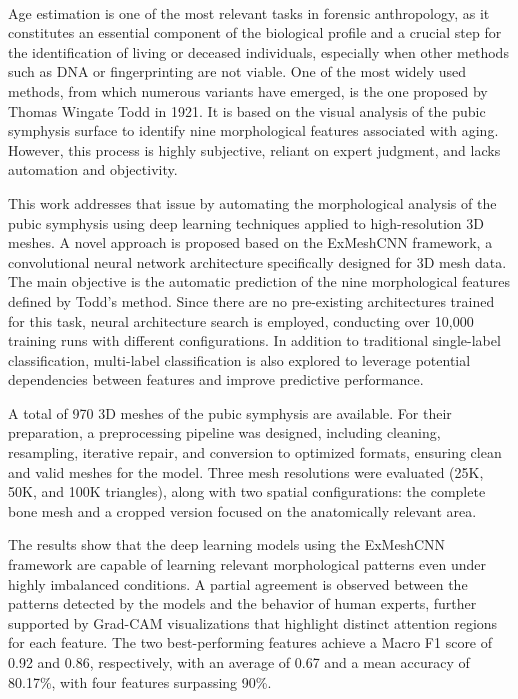 \vspace{0.7cm}
 \\

Age estimation is one of the most relevant tasks in forensic anthropology, as it constitutes an essential component of the biological profile and a crucial step for the identification of living or deceased individuals, especially when other methods such as DNA or fingerprinting are not viable. One of the most widely used methods, from which numerous variants have emerged, is the one proposed by Thomas Wingate Todd in 1921. It is based on the visual analysis of the pubic symphysis surface to identify nine morphological features associated with aging. However, this process is highly subjective, reliant on expert judgment, and lacks automation and objectivity.

This work addresses that issue by automating the morphological analysis of the pubic symphysis using deep learning techniques applied to high-resolution 3D meshes. A novel approach is proposed based on the ExMeshCNN framework, a convolutional neural network architecture specifically designed for 3D mesh data. The main objective is the automatic prediction of the nine morphological features defined by Todd's method. Since there are no pre-existing architectures trained for this task, neural architecture search is employed, conducting over 10,000 training runs with different configurations. In addition to traditional single-label classification, multi-label classification is also explored to leverage potential dependencies between features and improve predictive performance.

A total of 970 3D meshes of the pubic symphysis are available. For their preparation, a preprocessing pipeline was designed, including cleaning, resampling, iterative repair, and conversion to optimized formats, ensuring clean and valid meshes for the model. Three mesh resolutions were evaluated (25K, 50K, and 100K triangles), along with two spatial configurations: the complete bone mesh and a cropped version focused on the anatomically relevant area.

The results show that the deep learning models using the ExMeshCNN framework are capable of learning relevant morphological patterns even under highly imbalanced conditions. A partial agreement is observed between the patterns detected by the models and the behavior of human experts, further supported by Grad-CAM visualizations that highlight distinct attention regions for each feature. The two best-performing features achieve a Macro F1 score of 0.92 and 0.86, respectively, with an average of 0.67 and a mean accuracy of 80.17\%, with four features surpassing 90\%.

